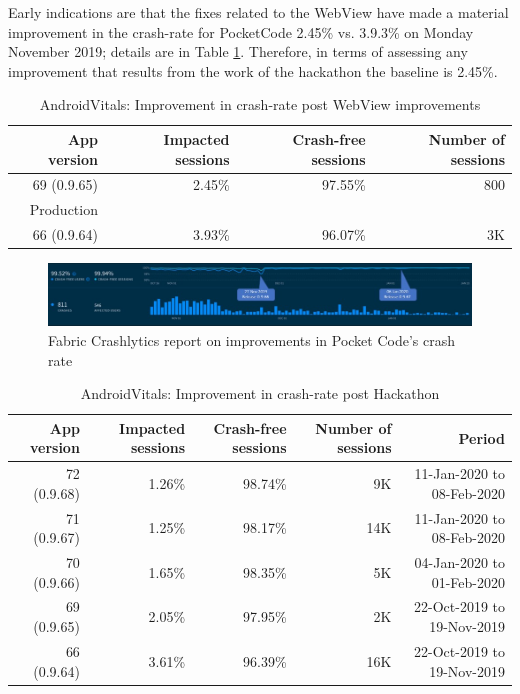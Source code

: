 Early indications are that the fixes related to the WebView have made a material improvement in the crash-rate for PocketCode 2.45\% vs. 3.9.3\% on Monday  November 2019; details are in Table \ref{tab:androidvitals_rollout_of_0_9_65}. Therefore, in terms of assessing any improvement that results from the work of the hackathon the baseline is 2.45\%.

\begin{table}
    \centering
    \footnotesize
    \begin{tabular}{r|r|r|r}
        App version &Impacted sessions &Crash-free sessions &Number of sessions  \\
        \hline
        69 (0.9.65) &2.45\% &	97.55\% 	&~800 \\
        Production &&& \\
        \hline
        66 (0.9.64) &3.93\% &96.07\% 	&~3K
    \end{tabular}
    \caption{AndroidVitals: Improvement in crash-rate post WebView improvements}
    \label{tab:androidvitals_rollout_of_0_9_65}
\end{table}



\begin{figure}
    \centering
    \includegraphics[width=\linewidth]{images/fabric-crashlytics/annotated_pocketcode_90_day_fabric_crashlytics_report.jpg}
    \caption{Fabric Crashlytics report on improvements in Pocket Code's crash rate}
    \label{fig:annotated_pocketcode_90_day_fabric_crashlytics_report}
\end{figure}

\begin{table}
    \centering
    \footnotesize
    \tabcolsep=0.06cm
    \begin{tabular}{r|r|r|r|r}
    \small
        App version &Impacted sessions &Crash-free sessions &Number of sessions &Period \\
        \hline
        72 (0.9.68) &1.26\% &   98.74\%     &~9K  &11-Jan-2020 to 08-Feb-2020 \\
        71 (0.9.67) &1.25\% &   98.17\%     &~14K &11-Jan-2020 to 08-Feb-2020 \\
        70 (0.9.66) &1.65\% &   98.35\%     &~5K  &04-Jan-2020 to 01-Feb-2020 \\
        69 (0.9.65) &2.05\% &	97.95\% 	&~2K  &22-Oct-2019 to 19-Nov-2019 \\
        \hline
        66 (0.9.64) &3.61\% &   96.39\% 	&~16K &22-Oct-2019 to 19-Nov-2019 \\
    \end{tabular}
    \caption{AndroidVitals: Improvement in crash-rate post Hackathon}
    \label{tab:androidvitals_crashrate_post_hackathon}
\end{table}

